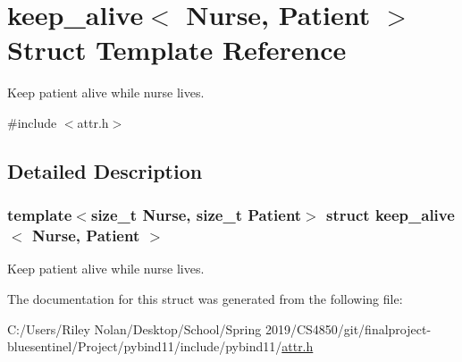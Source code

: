 \hypertarget{structkeep__alive}{}\section{keep\+\_\+alive$<$ Nurse, Patient $>$ Struct Template Reference}
\label{structkeep__alive}


Keep patient alive while nurse lives.  




{\ttfamily \#include $<$attr.\+h$>$}



\subsection{Detailed Description}
\subsubsection*{template$<$size\+\_\+t Nurse, size\+\_\+t Patient$>$\newline
struct keep\+\_\+alive$<$ Nurse, Patient $>$}

Keep patient alive while nurse lives. 

The documentation for this struct was generated from the following file\+:\begin{DoxyCompactItemize}
\item 
C\+:/\+Users/\+Riley Nolan/\+Desktop/\+School/\+Spring 2019/\+C\+S4850/git/finalproject-\/bluesentinel/\+Project/pybind11/include/pybind11/\mbox{\hyperlink{attr_8h}{attr.\+h}}\end{DoxyCompactItemize}
